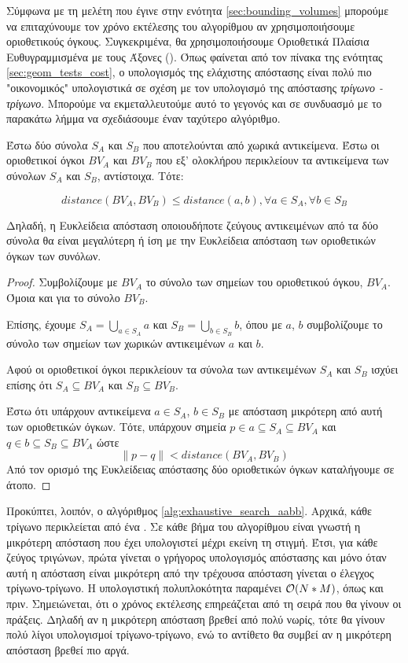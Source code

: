 Σύμφωνα με τη μελέτη που έγινε στην ενότητα \ref{sec:bounding_volumes}
μπορούμε να επιταχύνουμε τον χρόνο εκτέλεσης του αλγορίθμου αν 
χρησιμοποιήσουμε οριοθετικούς όγκους.
Συγκεκριμένα, θα χρησιμοποιήσουμε Οριοθετικά Πλαίσια Ευθυγραμμισμένα 
με τους Άξονες (). 
Όπως φαίνεται από τον πίνακα της ενότητας \ref{sec:geom_tests_cost},
ο υπολογισμός της ελάχιστης απόστασης \textit{} είναι πολύ πιο 
"οικονομικός" υπολογιστικά σε σχέση με τον υπολογισμό της απόστασης 
\textit{τρίγωνο - τρίγωνο}.
Μπορούμε να εκμεταλλευτούμε αυτό το γεγονός και σε συνδυασμό με το παρακάτω λήμμα 
να σχεδιάσουμε έναν ταχύτερο αλγόριθμο.

\begin{lemma}
    Έστω δύο σύνολα $S_A$ και $S_B$ που αποτελούνται από χωρικά αντικείμενα. 
    Έστω οι οριοθετικοί όγκοι $BV_A$ και $BV_B$ που εξ' ολοκλήρου περικλείουν 
    τα αντικείμενα των σύνολων  $S_A$ και $S_B$, αντίστοιχα. Τότε:
    
    \[ distance(BV_A, BV_B) \leq distance(a, b) , 
    \forall a \in S_A, \forall b \in S_B \]

    Δηλαδή, η Ευκλείδεια απόσταση οποιουδήποτε ζεύγους αντικειμένων από τα δύο σύνολα 
    θα είναι μεγαλύτερη ή ίση με την Ευκλείδεια απόσταση των οριοθετικών όγκων 
    των συνόλων.
    \label{lemma:box_distance}
\end{lemma}


\begin{proof}
    Συμβολίζουμε με $BV_A$ το σύνολο των σημείων του 
    οριοθετικού όγκου, $BV_A$. 
    Όμοια και για το σύνολο $BV_B$.

    Επίσης, έχουμε
    $S_A = \bigcup\limits_{a \in S_A} a $ και $S_B = \bigcup\limits_{b \in S_B} b$,
    όπου με $a$, $b$ συμβολίζουμε το σύνολο των σημείων των 
    χωρικών αντικειμένων $a$ και $b$.

    Αφού οι οριοθετικοί όγκοι περικλείουν τα σύνολα των 
    αντικειμένων $S_A$ και $S_B$ ισχύει επίσης ότι 
    $S_A \subseteq BV_A $ και 
    $S_B \subseteq BV_B $.

    Έστω ότι υπάρχουν αντικείμενα $a \in S_A$, $b \in S_B$ με απόσταση μικρότερη 
    από αυτή των οριοθετικών όγκων. Τότε, υπάρχουν σημεία $p \in a \subseteq S_A 
    \subseteq BV_A$ και $q \in b \subseteq S_B \subseteq BV_A$ ώστε 
    \[\lVert p - q \rVert < distance(BV_A, BV_B)\]
    Από τον ορισμό της Ευκλείδειας απόστασης δύο οριοθετικών όγκων καταλήγουμε 
    σε άτοπο.
\end{proof}

Προκύπτει, λοιπόν, ο αλγόριθμος \ref{alg:exhaustive_search_aabb}.
Αρχικά, κάθε τρίγωνο περικλείεται από 
ένα . Σε κάθε βήμα του αλγορίθμου είναι γνωστή η μικρότερη απόσταση 
που έχει υπολογιστεί μέχρι εκείνη τη στιγμή. Έτσι, για κάθε ζεύγος τριγώνων, 
πρώτα γίνεται ο γρήγορος υπολογισμός απόστασης  και μόνο όταν αυτή 
η απόσταση είναι μικρότερη από την τρέχουσα απόσταση γίνεται ο έλεγχος 
τρίγωνο-τρίγωνο.
Η υπολογιστική πολυπλοκότητα παραμένει $\mathcal{O}(N*M)$, όπως και πριν.
Σημειώνεται, ότι ο χρόνος εκτέλεσης επηρεάζεται από τη σειρά που θα γίνουν 
οι πράξεις. Δηλαδή αν η μικρότερη απόσταση βρεθεί από πολύ νωρίς, τότε 
θα γίνουν πολύ λίγοι υπολογισμοί τρίγωνο-τρίγωνο, ενώ το αντίθετο θα συμβεί 
αν η μικρότερη απόσταση βρεθεί πιο αργά.

